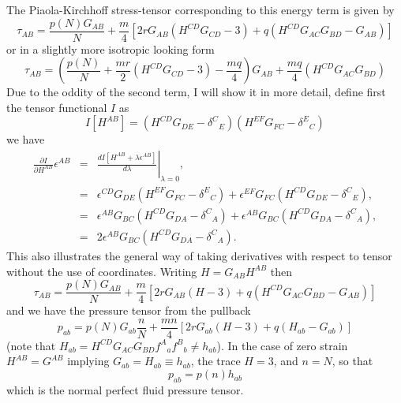The Piaola-Kirchhoff stress-tensor corresponding to this energy term is given by
\begin{equation}
\label{eqn:pkTensor}
\tau_{AB} = \frac{p(N)G_{AB}}{N} +
\frac{m}{4}\left[2rG_{AB}\left(H^{CD}G_{CD}-3\right) + q\left(H^{CD}G_{AC}G_{BD} - G_{AB}\right)\right]
\end{equation}
or in a slightly more isotropic looking form
\begin{equation}
\label{eqn:pkTensorIso}
\tau_{AB} = \left(\frac{p(N)}{N} +
\frac{mr}{2}\left(H^{CD}G_{CD}-3\right)-\frac{mq}{4}\right)G_{AB} +
\frac{mq}{4}\left(H^{CD}G_{AC}G_{BD}\right)
\end{equation}
Due to the oddity of the second term, I will show it in more detail, define first the tensor functional $I$ as
\begin{equation}
I[H^{AB}] = \left(H^{CD}G_{DE} - \delta^{C}{}_E\right)\left(H^{EF}G_{FC} - \delta^{E}{}_C\right)
\end{equation}
we have
\begin{eqnarray}
\frac{\partial I}{\partial H^{AB}}\epsilon^{AB} & =& \left.\frac{dI\left[H^{AB}+\lambda\epsilon^{AB}\right]}{d\lambda}\right|_{\lambda = 0}, \\
 & = & \epsilon^{CD}G_{DE}\left(H^{EF}G_{FC} - \delta^{E}{}_C\right) + \epsilon^{EF}G_{FC}\left(H^{CD}G_{DE} - \delta^{C}{}_E\right), \\
 & = & \epsilon^{AB}G_{BC}\left(H^{CD}G_{DA} - \delta^{C}{}_A\right) + \epsilon^{AB}G_{BC}\left(H^{CD}G_{DA} - \delta^{C}{}_A\right), \\
 & = & 2\epsilon^{AB}G_{BC}\left(H^{CD}G_{DA} - \delta^{C}{}_A\right).
\end{eqnarray}
This also illustrates the general way of taking derivatives with respect to tensor without the use of coordinates. Writing $H=G_{AB}H^{AB}$ then
\begin{equation}
\tau_{AB} = \frac{p(N)G_{AB}}{N} +
\frac{m}{4}\left[2rG_{AB}\left(H-3\right) + q\left(H^{CD}G_{AC}G_{BD} - G_{AB}\right)\right]
\end{equation}
and we have the pressure tensor from the pullback
\begin{equation}
p_{ab} = p(N)G_{ab}\frac{n}{N} +
\frac{mn}{4}\left[2rG_{ab}\left(H-3\right) + q\left(H_{ab} - G_{ab}\right)\right]
\end{equation}
(note that $H_{ab} = H^{CD}G_{AC}G_{BD} f^A{}_af^B{}_b \neq h_{ab}$). In the case of zero strain $H^{AB} = G^{AB}$ implying $G_{ab} = H_{ab}\equiv h_{ab}$, the trace $H=3$, and $n=N$, so that
\begin{equation}
p_{ab} = p(n)h_{ab}
\end{equation}
which is the normal perfect fluid pressure tensor.

